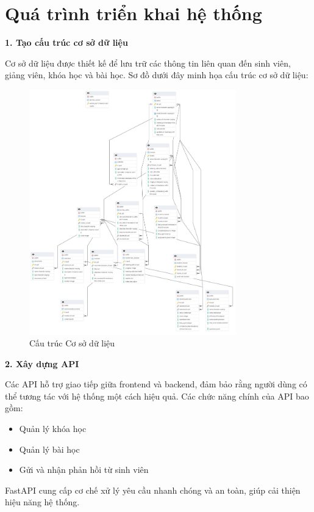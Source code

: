 \section{Quá trình triển khai hệ thống}

\textbf{1. Tạo cấu trúc cơ sở dữ liệu} 

Cơ sở dữ liệu được thiết kế để lưu trữ các thông tin liên quan đến sinh viên, giảng viên, khóa học và bài học. Sơ đồ dưới đây minh họa cấu trúc cơ sở dữ liệu:

\begin{figure}[H]
    \centering
    \includegraphics[width=0.8\textwidth]{Images/Implement/DB_diagram.jpg}
    \caption{Cấu trúc Cơ sở dữ liệu}
\end{figure}

\textbf{2. Xây dựng API} 

Các API hỗ trợ giao tiếp giữa frontend và backend, đảm bảo rằng người dùng có thể tương tác với hệ thống một cách hiệu quả. Các chức năng chính của API bao gồm:

\begin{itemize}
    \item Quản lý khóa học
    \item Quản lý bài học
    \item Gửi và nhận phản hồi từ sinh viên
\end{itemize}

FastAPI cung cấp cơ chế xử lý yêu cầu nhanh chóng và an toàn, giúp cải thiện hiệu năng hệ thống.

